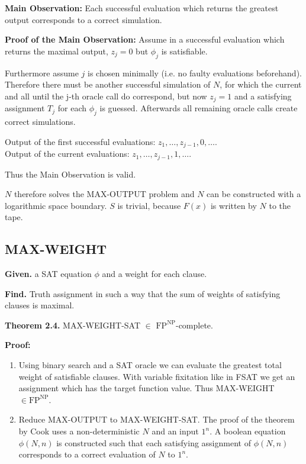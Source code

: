 \documentclass[a4paper]{article}
\newcommand{\given}[1]{\textbf{Given.} #1\par}
\newcommand{\find}[1]{\textbf{Find.} #1\par}
\newenvironment{spec}[0]{\begin{framed}}{\end{framed}}
\begin{document}
\textbf{Main Observation:}
Each successful evaluation which returns the greatest output corresponds
to a correct simulation.

\textbf{Proof of the Main Observation:}
Assume in a successful evaluation which returns the maximal output,
$z_j = 0$ but $\phi_j$ is satisfiable.

Furthermore assume $j$ is chosen minimally (i.e. no faulty evaluations beforehand).
Therefore there must be another successful simulation of $N$, for which the
current and all until the j-th oracle call do correspond, but now $z_j = 1$
and a satisfying assignment $T_j$ for each $\phi_j$ is guessed. Afterwards
all remaining oracle calls create correct simulations.

Output of the first successful evaluations: $z_1, \ldots, z_{j-1}, 0, \ldots$. \\
Output of the current evaluations: $z_1, \ldots, z_{j-1}, 1, \ldots$.

Thus the Main Observation is valid.

$N$ therefore solves the MAX-OUTPUT problem and $N$ can be constructed with
a logarithmic space boundary. $S$ is trivial, because $F(x)$ is written
by $N$ to the tape.

\subsection{MAX-WEIGHT}

\begin{spec}
  \given{a SAT equation $\phi$ and a weight for each clause.}
  \find{Truth assignment in such a way that the sum of weights of satisfying clauses is maximal.}
\end{spec}

\textbf{Theorem 2.4.} MAX-WEIGHT-SAT $\in$ $\text{FP}^{\text{NP}}$-complete.

\textbf{Proof:}
\begin{enumerate}
  \item
    Using binary search and a SAT oracle we can evaluate the greatest
    total weight of satisfiable clauses. With variable fixitation like in
    FSAT we get an assignment which has the target function value.
    Thus MAX-WEIGHT $\in \text{FP}^{\text{NP}}$.
  \item
    Reduce MAX-OUTPUT to MAX-WEIGHT-SAT.
    The proof of the theorem by Cook uses a non-deterministic $N$ and an input
    $1^n$. A boolean equation $\phi(N, n)$ is constructed such that each
    satisfying assignment of $\phi(N, n)$ corresponds to a correct evaluation
    of $N$ to $1^n$.
\end{enumerate}
\end{document}

